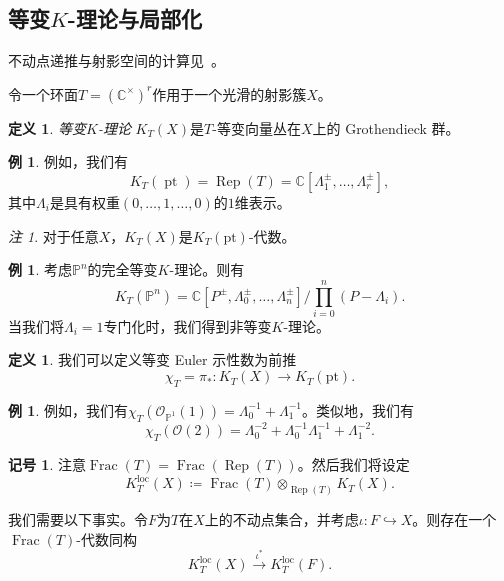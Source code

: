 \documentclass{amsart}
\theoremstyle{definition}
\newtheorem{defn}[thm]{定义}
\newtheorem{exm}[thm]{例}
\newtheorem{notn}[thm]{记号}
\theoremstyle{remark}
\newtheorem{rmk}[thm]{注}
\theoremstyle{plain}
\theoremstyle{definition}
\theoremstyle{remark}
\newcommand{\C}{\mathbb{C}}
\renewcommand{\P}{\mathbb{P}}
\newcommand{\mc}[1]{\mathcal{#1}}
\newcommand{\mr}[1]{\mathrm{#1}}
\newcommand{\on}[1]{\operatorname{#1}}
\newcommand{\1}{\mathbf{1}}
\newcommand{\2}{\mathbf{2}}
\newcommand{\3}{\mathbf{3}}
\newcommand{\loc}{\mr{loc}}
\begin{document}
\subsection{等变\(K\)-理论与局部化}%
\label{sub:Equivariant K-theory and localization}

不动点递推与射影空间的计算见~\cite{GiventalK2}。

令一个环面\(T = (\C^{\times})^r\)作用于一个光滑的射影簇\(X\)。

\begin{defn}
\textit{等变\(K\)-理论} \(K_T(X)\)是\(T\)-等变向量丛在\(X\)上的 Grothendieck 群。
\end{defn}

\begin{exm}
例如，我们有
    \[ K_T(\on{pt}) = \on{Rep}(T) = \C[\Lambda_1^{\pm}, \ldots, \Lambda_r^{\pm}], \]
其中\(\Lambda_i\)是具有权重\((0, \ldots, 1, \ldots, 0)\)的\(1\)维表示。
\end{exm}

\begin{rmk}
对于任意\(X\)，\(K_T(X)\)是\(K_T(\mr{pt})\)-代数。
\end{rmk}

\begin{exm}
考虑\(\P^n\)的完全等变\(K\)-理论。则有
    \[ K_T(\P^n) = \C[P^{\pm}, \Lambda_0^{\pm}, \ldots, \Lambda_n^{\pm}] \big/ \prod_{i=0}^n (P-\Lambda_i). \]
当我们将\(\Lambda_i = 1\)专门化时，我们得到非等变\(K\)-理论。
\end{exm}

\begin{defn}
我们可以定义等变 Euler 示性数为前推
    \[ \chi_T = \pi_* \colon K_T(X) \to K_T(\mr{pt}). \]
\end{defn}

\begin{exm}
例如，我们有\(\chi_T(\mc{O}_{\P^1}(1)) = \Lambda_0^{-1} + \Lambda_1^{-1}\)。类似地，我们有
    \[ \chi_T(\mc{O}(2)) = \Lambda_0^{-2} + \Lambda_0^{-1} \Lambda_1^{-1} + \Lambda_1^{-2}. \]
\end{exm}

\begin{notn}
注意\(\on{Frac}(T) = \on{Frac}(\on{Rep}(T))\)。然后我们将设定
    \[ K_T^{\loc}(X) \coloneqq \on{Frac}(T) \otimes_{\on{Rep}(T)} K_T(X). \]
\end{notn}

我们需要以下事实。令\(F\)为\(T\)在\(X\)上的不动点集合，并考虑\(\iota \colon F \hookrightarrow X\)。则存在一个\(\on{Frac}(T)\)-代数同构
\[ K_T^{\loc}(X) \xrightarrow{\iota^*} K_T^{\loc}(F). \]
\end{document}
